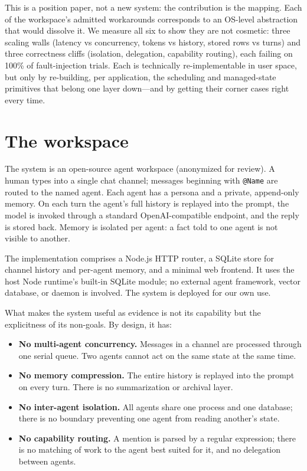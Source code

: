 \documentclass[sigconf, review, anonymous]{acmart}
\begin{document}
This is a position paper, not a new system: the contribution is the mapping.
Each of the workspace's admitted workarounds corresponds to an OS-level
abstraction that would dissolve it.
We measure all six to show they are not cosmetic: three scaling walls
(latency vs concurrency, tokens vs history, stored rows vs turns) and three
correctness cliffs (isolation, delegation, capability routing), each failing
on 100\% of fault-injection trials. Each is technically re-implementable in user space, but
only by re-building, per application, the scheduling and managed-state
primitives that belong one layer down---and by getting their corner cases
right every time.

\section{The workspace}

The system is an open-source agent workspace (anonymized for review). A
human types into a single chat channel; messages beginning with
\texttt{@Name} are routed to the named agent. Each agent has a persona and a
private, append-only memory. On each turn the agent's full history is
replayed into the prompt, the model is invoked through a standard
OpenAI-compatible endpoint, and the reply is stored back. Memory is
isolated per agent: a fact told to one agent is not visible to another.

The implementation comprises a Node.js HTTP router, a SQLite store for
channel history and per-agent memory, and a minimal web frontend. It uses
the host Node runtime's built-in SQLite module; no external agent
framework, vector database, or daemon is involved. The system is deployed
for our own use.

What makes the system useful as evidence is not its capability but the
explicitness of its non-goals. By design, it has:

\begin{itemize}
  \item \textbf{No multi-agent concurrency.} Messages in a channel are
        processed through one serial queue. Two agents cannot act on the
        same state at the same time.
  \item \textbf{No memory compression.} The entire history is replayed
        into the prompt on every turn. There is no summarization or
        archival layer.
  \item \textbf{No inter-agent isolation.} All agents share one process
        and one database; there is no boundary preventing one agent from
        reading another's state.
  \item \textbf{No capability routing.} A mention is parsed by a regular
        expression; there is no matching of work to the agent best suited
        for it, and no delegation between agents.
\end{itemize}
\end{document}
